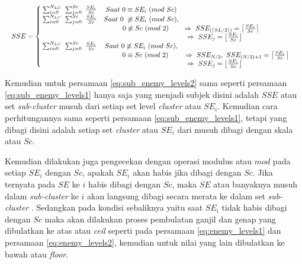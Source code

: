 \begin{equation}\label{eq:sub_enemy_levels2}
\resizebox{\columnwidth}{!}{%
	$SSE = \left\{\begin{matrix}
	\hspace{0.2em} \sum_{i = 0}^{N_{LC}}\ \sum_{j = 0}^{Sc}\ \frac{SE_{i}}{Sc} & Saat\ 0 \equiv SE_{i}\ (mod\ Sc) & \\
	
	\hspace{0.2em} \sum_{i = 0}^{N_{LC}}\ \sum_{j = 0}^{Sc}\ \frac{SE_{i}}{Sc} & Saat\ 0 \hspace{0.3em} \not\equiv SE_{i}\ (mod\ Sc), & \\
	&\hspace{1.3em}  0 \not\equiv Sc\ (mod\ 2) & \hspace{-4.5em} \Rightarrow\ SSE_{(\left \lceil SL/2 \right \rceil)}  = \left \lceil \frac{SE_{i}}{Sc} \right \rceil &\\
	
	& & \hspace{-6.6em} \Rightarrow\ SSE_{j}  = \left \lfloor \frac{SE_{i}}{Sc} \right \rfloor &\\
	
	\hspace{0.2em} \sum_{i = 0}^{N_{LC}}\ \sum_{j = 0}^{Sc}\ \frac{SE_{i}}{Sc} & Saat\ 0 \not\equiv SE_{i}\ (mod\ Sc), & \\
	&\hspace{1.2em}  0 \equiv Sc\ (mod\ 2) & \Rightarrow\ SSE_{N/2},\ SSE_{(N/2) + 1}  = \left \lceil \frac{SE_{i}}{Sc} \right \rceil &\\
	
	& & \hspace{-6.6em} \Rightarrow\ SSE_{j}  = \left \lfloor \frac{SE_{i}}{Sc} \right \rfloor &\\
	\end{matrix}\right.$%
}
\end{equation}

Kemudian untuk persamaan \ref{eq:sub_enemy_levels2} sama seperti persamaan \ref{eq:sub_enemy_levels1} hanya saja yang menjadi subjek disini adalah $SSE$ atau set \textit{sub-cluster} musuh dari setiap set level \textit{cluster} atau $SE_{i}$. Kemudian cara perhitungannya sama seperti persamaan \ref{eq:sub_enemy_levels1}, tetapi yang dibagi disini adalah setiap set \textit{cluster} atau $SE_{i}$ dari musuh dibagi dengan skala atau $Sc$. 
\vspace{1ex}

Kemudian dilakukan juga pengecekan dengan operasi modulus atau $mod$ pada setiap $SE_{i}$ dengan $Sc$, apakah $SE_{i}$ akan habis jika dibagi dengan $Sc$. Jika ternyata pada $SE$ ke $i$ habis dibagi dengan $Sc$, maka $SE$ atau banyaknya musuh dalam \textit{sub-cluster} ke $i$ akan langsung dibagi secara merata ke dalam set \textit{sub-cluster} . Sedangkan pada kondisi sebaliknya yaitu saat $SE_{i}$ tidak habis dibagi dengan $Sc$ maka akan dilakukan proses pembulatan ganjil dan genap yang dibulatkan ke atas atau \textit{ceil} seperti pada persamaan \ref{eq:enemy_levels1} dan persamaan \ref{eq:enemy_levels2}, kemudian untuk nilai yang lain dibulatkan ke bawah atau \textit{floor}.
\vspace{1ex}

